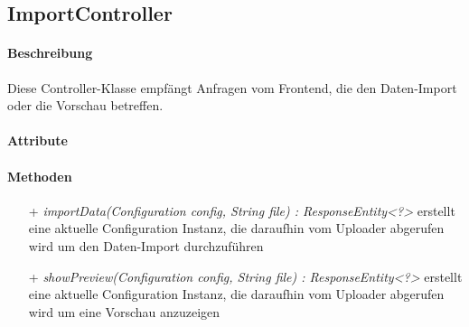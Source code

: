 \subsection{ImportController}

\paragraph{Beschreibung}
Diese Controller-Klasse empfängt Anfragen vom Frontend, die den Daten-Import oder die Vorschau betreffen.


\paragraph{Attribute}

\paragraph{Methoden}
\begin{itemize}
\item[+] \textit{ importData(Configuration config, String file) : ResponseEntity<?>}
 erstellt eine aktuelle Configuration Instanz, die daraufhin vom Uploader abgerufen wird um den Daten-Import durchzuführen
\item[+] \textit{showPreview(Configuration config, String file) : ResponseEntity<?>}
erstellt eine aktuelle Configuration Instanz, die daraufhin vom Uploader abgerufen wird um eine Vorschau anzuzeigen
\end{itemize}